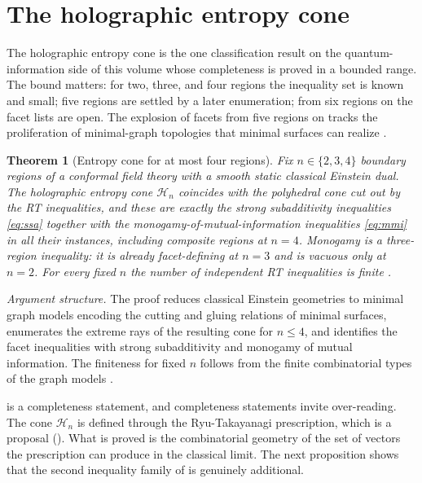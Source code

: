 \documentclass[11pt,letterpaper]{article}
\newtheorem{theorem}{Theorem}[section]
\theoremstyle{definition}
\theoremstyle{remark}
\begin{document}
\section{The holographic entropy cone}

The holographic entropy cone is the one classification result on the quantum-information side of this volume whose completeness is proved in a bounded range. The bound matters: for two, three, and four regions the inequality set is known and small; five regions are settled by a later enumeration; from six regions on the facet lists are open. The explosion of facets from five regions on tracks the proliferation of minimal-graph topologies that minimal surfaces can realize \cite{baoetal}.

\begin{theorem}[Entropy cone for at most four regions]\label{thm:cone}
Fix $n \in \{2, 3, 4\}$ boundary regions of a conformal field theory with a smooth static classical Einstein dual. The holographic entropy cone $\mathcal{H}_n$ coincides with the polyhedral cone cut out by the RT inequalities, and these are exactly the strong subadditivity inequalities \eqref{eq:ssa} together with the monogamy-of-mutual-information inequalities \eqref{eq:mmi} in all their instances, including composite regions at $n = 4$. Monogamy is a three-region inequality: it is already facet-defining at $n = 3$ and is vacuous only at $n = 2$. For every fixed $n$ the number of independent RT inequalities is finite \cite{baoetal}.
\end{theorem}

\par\medskip\noindent\emph{Argument structure.}
The proof reduces classical Einstein geometries to minimal graph models encoding the cutting and gluing relations of minimal surfaces, enumerates the extreme rays of the resulting cone for $n \le 4$, and identifies the facet inequalities with strong subadditivity and monogamy of mutual information. The finiteness for fixed $n$ follows from the finite combinatorial types of the graph models \cite{baoetal}.
\par\medskip

 is a completeness statement, and completeness statements invite over-reading. The cone $\mathcal{H}_n$ is defined through the Ryu-Takayanagi prescription, which is a proposal (). What is proved is the combinatorial geometry of the set of vectors the prescription can produce in the classical limit. The next proposition shows that the second inequality family of  is genuinely additional.
\end{document}
